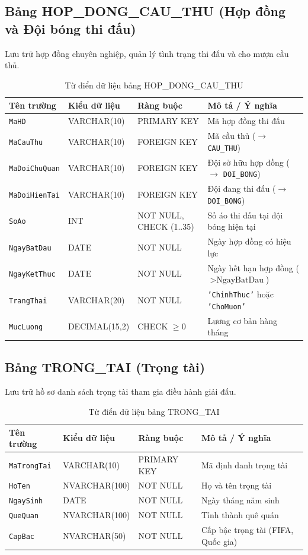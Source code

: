\subsection{Bảng HOP\_DONG\_CAU\_THU (Hợp đồng và Đội bóng thi đấu)}
Lưu trữ hợp đồng chuyên nghiệp, quản lý tình trạng thi đấu và cho mượn cầu thủ.
\begin{table}[H]
\centering
\small
\begin{tabular}{|l|l|l|p{6cm}|}
\hline
\textbf{Tên trường} & \textbf{Kiểu dữ liệu} & \textbf{Ràng buộc} & \textbf{Mô tả / Ý nghĩa} \\ \hline
\texttt{MaHD} & VARCHAR(10) & PRIMARY KEY & Mã hợp đồng thi đấu \\ \hline
\texttt{MaCauThu} & VARCHAR(10) & FOREIGN KEY & Mã cầu thủ ($\rightarrow$ \texttt{CAU\_THU}) \\ \hline
\texttt{MaDoiChuQuan} & VARCHAR(10) & FOREIGN KEY & Đội sở hữu hợp đồng ($\rightarrow$ \texttt{DOI\_BONG}) \\ \hline
\texttt{MaDoiHienTai} & VARCHAR(10) & FOREIGN KEY & Đội đang thi đấu ($\rightarrow$ \texttt{DOI\_BONG}) \\ \hline
\texttt{SoAo} & INT & NOT NULL, CHECK (1..35) & Số áo thi đấu tại đội bóng hiện tại \\ \hline
\texttt{NgayBatDau} & DATE & NOT NULL & Ngày hợp đồng có hiệu lực \\ \hline
\texttt{NgayKetThuc} & DATE & NOT NULL & Ngày hết hạn hợp đồng ($> \text{NgayBatDau}$) \\ \hline
\texttt{TrangThai} & VARCHAR(20) & NOT NULL & \texttt{'ChinhThuc'} hoặc \texttt{'ChoMuon'} \\ \hline
\texttt{MucLuong} & DECIMAL(15,2) & CHECK $\ge 0$ & Lương cơ bản hàng tháng \\ \hline
\end{tabular}
\caption{Từ điển dữ liệu bảng HOP\_DONG\_CAU\_THU}
\end{table}

\subsection{Bảng TRONG\_TAI (Trọng tài)}
Lưu trữ hồ sơ danh sách trọng tài tham gia điều hành giải đấu.
\begin{table}[H]
\centering
\small
\begin{tabular}{|l|l|l|p{6cm}|}
\hline
\textbf{Tên trường} & \textbf{Kiểu dữ liệu} & \textbf{Ràng buộc} & \textbf{Mô tả / Ý nghĩa} \\ \hline
\texttt{MaTrongTai} & VARCHAR(10) & PRIMARY KEY & Mã định danh trọng tài \\ \hline
\texttt{HoTen} & NVARCHAR(100) & NOT NULL & Họ và tên trọng tài \\ \hline
\texttt{NgaySinh} & DATE & NOT NULL & Ngày tháng năm sinh \\ \hline
\texttt{QueQuan} & NVARCHAR(100) & NOT NULL & Tỉnh thành quê quán \\ \hline
\texttt{CapBac} & NVARCHAR(50) & NOT NULL & Cấp bậc trọng tài (FIFA, Quốc gia) \\ \hline
\end{tabular}
\caption{Từ điển dữ liệu bảng TRONG\_TAI}
\end{table}

